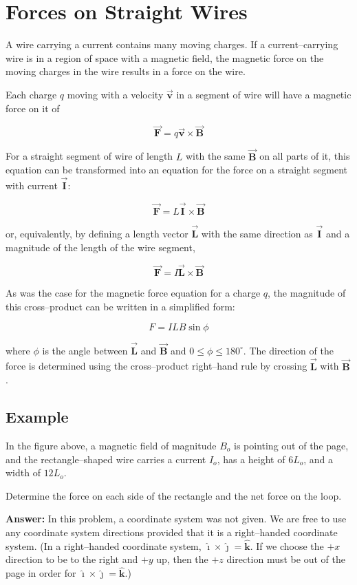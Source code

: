 \documentclass{article}
\newcommand{\ihat}[0]{\hat{\boldsymbol{\imath}}}
\newcommand{\jhat}[0]{\hat{\boldsymbol{\jmath}}}
\newcommand{\khat}[0]{\hat{\boldsymbol{k}}}
\newcommand{\bfvec}[1]{\vec{\mathbf{#1}}}
\begin{document}
\section{Forces on Straight Wires}

A wire carrying a current contains many moving charges. If a current--carrying wire is in a region of space with a magnetic field, the magnetic force on the moving charges in the wire results in a force on the wire.

Each charge $q$ moving with a velocity $\bfvec{v}$ in a segment of wire  will have a magnetic force on it of

$$\bfvec{F} = q\bfvec{v}\times\bfvec{B}$$

For a straight segment of wire of length $L$ with the same $\bfvec{B}$ on all parts of it, this equation can be transformed into an equation for the force on a straight segment with current $\bfvec{I}$:

$$\bfvec{F} = L\bfvec{I}\times\bfvec{B}$$

or, equivalently, by defining a length vector $\bfvec{L}$ with the same direction as $\bfvec{I}$ and a magnitude of the length of the wire segment,

$$\bfvec{F} = I\bfvec{L}\times\bfvec{B}$$

As was the case for the magnetic force equation for a charge $q$, the magnitude of this cross--product can be written in a simplified form:

$$F=ILB\sin\phi$$

where $\phi$ is the angle between $\bfvec{L}$ and $\bfvec{B}$ and $0 \le\phi \le 180^{\circ}$. The direction of the force is determined using the cross--product right--hand rule by crossing $\bfvec{L}$ with $\bfvec{B}$.

\newpage

\subsection{Example}



In the figure above, a magnetic field of magnitude $B_o$ is pointing out of the page, and the rectangle--shaped wire carries a current $I_o$, has a height of $6L_o$, and a width of $12L_o$.

Determine the force on each side of the rectangle and the net force on the loop.

{\bf Answer: } In this problem, a coordinate system was not given. We are free to use any coordinate system directions provided that it is a right--handed coordinate system. (In a right--handed coordinate system, $\ihat\times\jhat=\khat$. If we choose the $+x$ direction to be to the right and $+y$ up, then the $+z$ direction must be out of the page in order for $\ihat\times\jhat=\khat$.)
\end{document}
